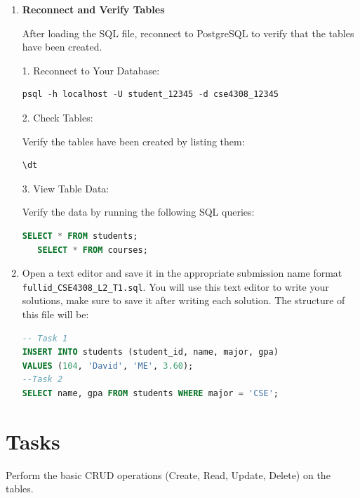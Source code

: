\documentclass[12pt,a4paper]{article}
\begin{document}
\begin{enumerate}
   This will:
   - Drop old tables (if they exist).
   - Create new tables.
   - Insert initial rows of data.

\item \textbf{Reconnect and Verify Tables}

After loading the SQL file, reconnect to PostgreSQL to verify that the tables have been created.

1. Reconnect to Your Database:

   \begin{lstlisting}[language=SQL]
   psql -h localhost -U student_12345 -d cse4308_12345
   \end{lstlisting}

2. Check Tables:

   Verify the tables have been created by listing them:

   \begin{lstlisting}[language=SQL]
   \dt
   \end{lstlisting}

3. View Table Data:

   Verify the data by running the following SQL queries:

   \begin{lstlisting}[language=SQL]
   SELECT * FROM students;
   SELECT * FROM courses;
   \end{lstlisting}

\item Open a text editor and save it in the appropriate submission name format \\ \texttt{fullid\_CSE4308\_L2\_T1.sql}. You will use this text editor to write your solutions, make sure to save it after writing each solution. The structure of this file will be:
\begin{lstlisting}[language=SQL]
-- Task 1
INSERT INTO students (student_id, name, major, gpa)
VALUES (104, 'David', 'ME', 3.60);
--Task 2
SELECT name, gpa FROM students WHERE major = 'CSE';
\end{lstlisting}
\end{enumerate}
\newpage
\section*{Tasks}
Perform the basic CRUD operations (Create, Read, Update, Delete) on the tables.
\end{document}
